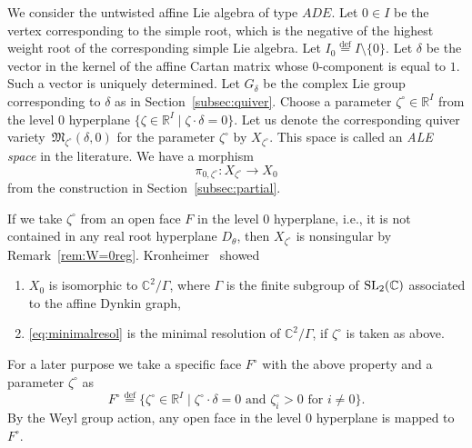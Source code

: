 \documentclass[pdftex]{sigma}
\newenvironment{aenume}{%
  \begin{enumerate}%
  \renewcommand{\theenumi}{\alph{enumi}}%
  \renewcommand{\labelenumi}{\textup{(\theenumi)}}%
  }{\end{enumerate}}
\theoremstyle{definition}
\numberwithin{equation}{section}
\newcommand{\subsecref}[1]{Section~\ref{#1}}
\newcommand{\remref}[1]{Remark~\ref{#1}}
\newcommand{\defeq}{\overset{\operatorname{\scriptstyle def}}{=}}
\newcommand{\C}{{\mathbb C}}
\newcommand{\R}{{\mathbb R}}
\newcommand{\SL}{\operatorname{\rm SL}}
\newcommand{\M}{{\mathfrak M}} %
\begin{document}
We consider the untwisted af\/f\/ine Lie algebra of type $ADE$.
%
Let $0\in I$ be the vertex corresponding to the simple root, which is
the negative of the highest weight root of the corresponding simple
Lie algebra. Let $I_0 \defeq I\setminus \{0\}$. Let $\delta$ be the
vector in the kernel of the af\/f\/ine Cartan matrix whose $0$-component
is equal to $1$. Such a vector is uniquely determined.
%
Let $G_\delta$ be the complex Lie group corresponding to $\delta$ as
in \subsecref{subsec:quiver}. Choose a parameter $\zeta^\circ \in
\R^I$ from the level $0$ hyperplane $\{ \zeta\in\R^I \mid
\zeta\cdot \delta = 0\}$.
%
Let us denote the corresponding quiver variety~$\M_{\zeta^\circ}(\delta,0)$
for the parameter $\zeta^\circ$ by $X_{\zeta^\circ}$.
%
This space is called an {\it ALE space} in the literature.
We have a morphism
\begin{equation}\label{eq:minimalresol}
   \pi_{0,\zeta^\circ}\colon X_{\zeta^\circ} \to X_0
\end{equation}
from the construction in \subsecref{subsec:partial}.

If we take $\zeta^\circ$ from an open face $F$ in the level $0$ hyperplane,
i.e., it is not contained in any real root hyperplane $D_\theta$, then
$X_{\zeta^\circ}$ is nonsingular by \remref{rem:W=0reg}. Kronheimer~\cite{Kr}
showed
\begin{aenume}\itemsep=0pt
\item $X_0$ is isomorphic to $\C^2/\Gamma$, where $\Gamma$ is the
  f\/inite subgroup of $\SL_2(\C)$ associated to the af\/f\/ine Dynkin
  graph,

\item \eqref{eq:minimalresol} is the minimal resolution of
  $\C^2/\Gamma$, if $\zeta^\circ$ is taken as above.
\end{aenume}

For a later purpose we take a specif\/ic face $F^\circ$ with the above
property and a parameter $\zeta^\circ$ as
\begin{equation*}
  F^\circ \defeq \{ \zeta^\circ\in \R^I \mid
  \text{$\zeta^\circ\cdot \delta = 0$ and $\zeta^\circ_i > 0$ for $i\neq 0$}\}.
\end{equation*}
By the Weyl group action, any open face in the level $0$ hyperplane is
mapped to $F^\circ$.
\end{document}
